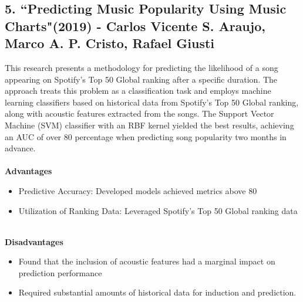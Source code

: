 \documentclass[11pt]{report}
\begin{document}
\subsection*{5.  ``Predicting Music Popularity Using Music Charts"(2019) - Carlos Vicente S. Araujo, Marco A. P. Cristo, Rafael Giusti\cite{reference5}}
This research presents a methodology for predicting the likelihood of a song appearing on Spotify’s Top 50 Global ranking after a specific duration. The approach treats this problem as a classification task and employs machine learning classifiers based on historical data from Spotify’s Top 50 Global ranking, along with acoustic features extracted from the songs. The Support Vector Machine (SVM) classifier with an RBF kernel yielded the best results, achieving an AUC of over 80 percentage when predicting song popularity two months in advance.
\\ \\
\textbf{Advantages}
    \begin{itemize}
        \item Predictive Accuracy: Developed models achieved metrics above 80%
        \item Utilization of Ranking Data: Leveraged Spotify's Top 50 Global ranking data
    \end{itemize}
\\    
    \textbf{Disadvantages}
    \begin{itemize}
        \item Found that the inclusion of acoustic features had a marginal impact on prediction performance
        \item Required substantial amounts of historical data for induction and prediction.
    \end{itemize}

\\\\
\end{document}
